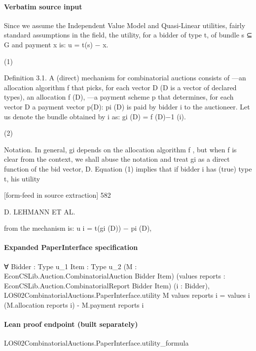 \documentclass[10pt]{article}
\begin{document}
\paragraph{Verbatim source input}
\begin{ReviewVerbatim}
Since we assume the Independent Value Model and Quasi-Linear utilities, fairly
standard assumptions in the field, the utility, for a bidder of type t, of bundle s ⊆ G
and payment x is:
u = t(s) − x.

(1)

Definition 3.1. A (direct) mechanism for combinatorial auctions consists of
—an allocation algorithm f that picks, for each vector D (D is a vector of declared
types), an allocation f (D),
—a payment scheme p that determines, for each vector D a payment vector p(D):
pi (D) is paid by bidder i to the auctioneer.
Let us denote the bundle obtained by i as:
gi (D) = f (D)−1 (i).

(2)

Notation. In general, gi depends on the allocation algorithm f , but when f is
clear from the context, we shall abuse the notation and treat gi as a direct function
of the bid vector, D. Equation (1) implies that if bidder i has (true) type t, his utility


[form-feed in source extraction]
582

D. LEHMANN ET AL.

from the mechanism is:
u i = t(gi (D)) − pi (D),
\end{ReviewVerbatim}


\paragraph{Expanded PaperInterface specification}
\begin{ReviewVerbatim}
∀ {Bidder : Type u_1} {Item : Type u_2} (M : EconCSLib.Auction.CombinatorialAuction Bidder Item)
  (values reports : EconCSLib.Auction.CombinatorialReport Bidder Item) (i : Bidder),
  LOS02CombinatorialAuctions.PaperInterface.utility M values reports i =
    values i (M.allocation reports i) - M.payment reports i
\end{ReviewVerbatim}

\paragraph{Lean proof endpoint (built separately)}\begin{ReviewVerbatim}
LOS02CombinatorialAuctions.PaperInterface.utility_formula
\end{ReviewVerbatim}
\end{document}

